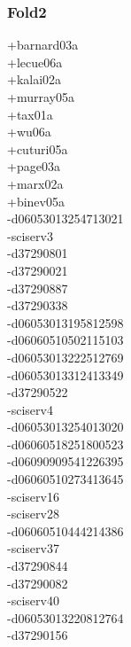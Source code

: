 \begin{multicols}{4}
\subsubsection*{Fold2}
+barnard03a\\
+lecue06a\\
+kalai02a\\
+murray05a\\
+tax01a\\
+wu06a\\
+cuturi05a\\
+page03a\\
+marx02a\\
+binev05a\\
-d06053013254713021\\
-sciserv3\\
-d37290801\\
-d37290021\\
-d37290887\\
-d37290338\\
-d06053013195812598\\
-d06060510502115103\\
-d06053013222512769\\
-d06053013312413349\\
-d37290522\\
-sciserv4\\
-d06053013254013020\\
-d06060518251800523\\
-d06090909541226395\\
-d06060510273413645\\
-sciserv16\\
-sciserv28\\
-d06060510444214386\\
-sciserv37\\
-d37290844\\
-d37290082\\
-sciserv40\\
-d06053013220812764\\
-d37290156\\

\end{multicols}
